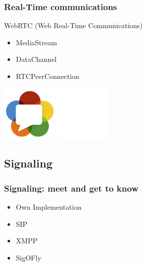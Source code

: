 \documentclass[compress]{beamer}
\begin{document}
		\begin{frame}[c]
		\frametitle{Real-Time communications}

		WebRTC (Web Real-Time Communications)

		\begin{itemize}
		\item MediaStream	
		\item DataChannel
		\item RTCPeerConnection
		\end{itemize}

		\begin{flushright}

			\vspace*{-5\baselineskip}
			\includegraphics[width=0.2\textwidth]{figures/webrtc.png}
			\includegraphics[width=0.2\textwidth]{figures/space.png}
		\end{flushright}
		
		\end{frame}



	\subsection{Signaling}
  		\begin{frame}[c]
		\frametitle{Signaling: meet and get to know}
		\begin{itemize}
		\item Own Implementation
		\vfill
		\item SIP
		\vfill
		\item XMPP
		\vfill
		\item SigOFly 
		\end{itemize}
		\end{frame}
\end{document}
